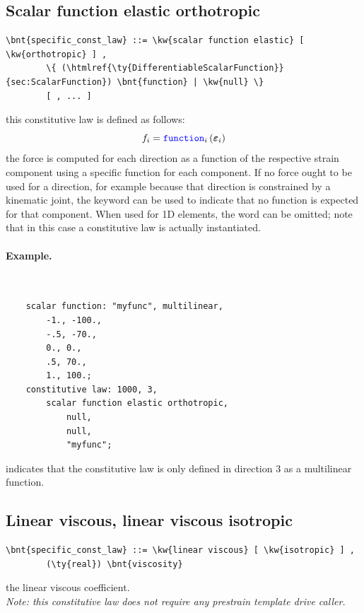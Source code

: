 \subsection{Scalar function elastic orthotropic}
\begin{Verbatim}[commandchars=\\\{\}]
    \bnt{specific_const_law} ::= \kw{scalar function elastic} [ \kw{orthotropic} ] ,
        \{ (\htmlref{\ty{DifferentiableScalarFunction}}{sec:ScalarFunction}) \bnt{function} | \kw{null} \}
        [ , ... ]
\end{Verbatim}
this constitutive law is defined as follows:
\begin{displaymath}
	f_i = \textcolor{blue}{\texttt{function}}_i \left( \boldsymbol{\varepsilon}_i \right)
\end{displaymath}
the force is computed for each direction as a function of the respective
strain component using a specific function for each component.
If no force ought to be used for a direction, for example because 
that direction is constrained by a kinematic joint, the keyword 
can be used to indicate that no function is expected for that component.
When used for 1D elements, the word  can be omitted;
note that in this case a 
constitutive law is actually instantiated.

\paragraph{Example.} \
\begin{verbatim}
    scalar function: "myfunc", multilinear,
        -1., -100.,
        -.5, -70.,
        0., 0.,
        .5, 70.,
        1., 100.;
    constitutive law: 1000, 3,
        scalar function elastic orthotropic,
            null,
            null,
            "myfunc";
\end{verbatim}
indicates that the constitutive law is only defined in direction 3 
as a multilinear function.

\subsection{Linear viscous, linear viscous isotropic}
\begin{Verbatim}[commandchars=\\\{\}]
    \bnt{specific_const_law} ::= \kw{linear viscous} [ \kw{isotropic} ] , 
        (\ty{real}) \bnt{viscosity}
\end{Verbatim}
the linear viscous coefficient. \\
{\em 
    Note: this constitutive law does not require any prestrain template
    drive caller.
}
  
